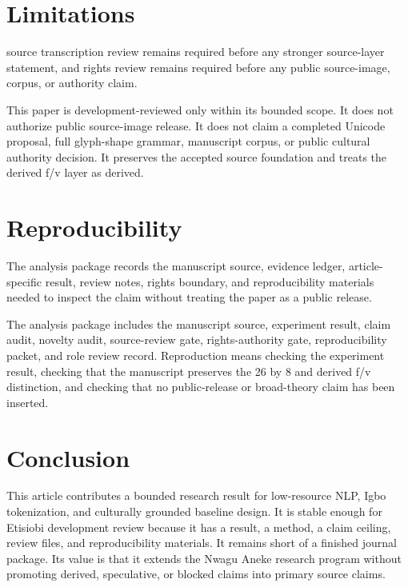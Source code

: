 \documentclass[sigconf,nonacm]{acmart}
\begin{document}
\section{Limitations}
source transcription review remains required before any stronger source-layer statement, and rights review remains required before any public source-image, corpus, or authority claim. 

This paper is development-reviewed only within its bounded scope. It does not
authorize public source-image release. It does not claim a completed Unicode
proposal, full glyph-shape grammar, manuscript corpus, or public cultural
authority decision. It preserves the accepted source foundation and treats the
derived f/v layer as derived.

\section{Reproducibility}
The analysis package records the manuscript source, evidence ledger, article-specific result, review notes, rights boundary, and reproducibility materials needed to inspect the claim without treating the paper as a public release. 

The analysis package includes the manuscript source, experiment result, claim
audit, novelty audit, source-review gate, rights-authority gate,
reproducibility packet, and role review record. Reproduction means checking the
experiment result, checking that the manuscript preserves the 26 by 8 and
derived f/v distinction, and checking that no public-release or broad-theory
claim has been inserted.

\section{Conclusion}
This article contributes a bounded research result for low-resource NLP, Igbo
tokenization, and culturally grounded baseline design. It is stable enough for
Etisiobi development review because it has a result, a method, a claim ceiling,
review files, and reproducibility materials. It remains short of a finished
journal package. Its value is that it extends the Nwagu Aneke research program
without promoting derived, speculative, or blocked claims into primary source
claims.



\end{document}
